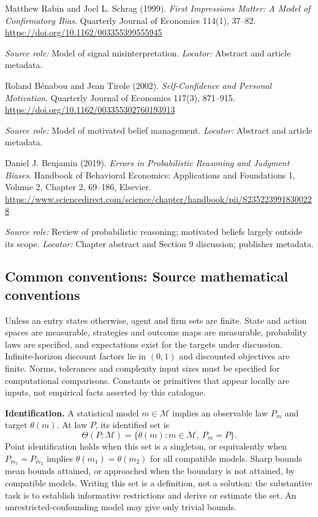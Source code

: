 \documentclass[11pt,a4paper]{article}
\begin{document}
\begin{enumerate}[label={[S\arabic*]},leftmargin=*]

\item Matthew Rabin and Joel L. Schrag (1999). \emph{First Impressions Matter: A Model of Confirmatory Bias}. Quarterly Journal of Economics 114(1), 37--82. \url{https://doi.org/10.1162/003355399555945}\par \textit{Source role:} Model of signal misinterpretation. \textit{Locator:} Abstract and article metadata.

\item Roland Bénabou and Jean Tirole (2002). \emph{Self-Confidence and Personal Motivation}. Quarterly Journal of Economics 117(3), 871--915. \url{https://doi.org/10.1162/003355302760193913}\par \textit{Source role:} Model of motivated belief management. \textit{Locator:} Abstract and article metadata.

\item Daniel J. Benjamin (2019). \emph{Errors in Probabilistic Reasoning and Judgment Biases}. Handbook of Behavioral Economics: Applications and Foundations 1, Volume 2, Chapter 2, 69--186, Elsevier. \url{https://www.sciencedirect.com/science/chapter/handbook/pii/S2352239918300228}\par \textit{Source role:} Review of probabilistic reasoning; motivated beliefs largely outside its scope. \textit{Locator:} Chapter abstract and Section 9 discussion; publisher metadata.

\end{enumerate}

\subsection*{Common conventions: Source mathematical conventions}

Unless an entry states otherwise, agent and firm sets are finite. State and action spaces are measurable, strategies and outcome maps are measurable, probability laws are specified, and expectations exist for the targets under discussion. Infinite-horizon discount factors lie in $(0,1)$ and discounted objectives are finite. Norms, tolerances and complexity input sizes must be specified for computational comparisons. Constants or primitives that appear locally are inputs, not empirical facts asserted by this catalogue.

\textbf{Identification.} A statistical model $m\in\mathcal M$ implies an observable law $P_m$ and target $\theta(m)$. At law $P$, its identified set is
\[
\Theta(P;\mathcal M)=\{\theta(m):m\in\mathcal M,\ P_m=P\}.
\]
Point identification holds when this set is a singleton, or equivalently when $P_{m_1}=P_{m_2}$ implies $\theta(m_1)=\theta(m_2)$ for all compatible models. Sharp bounds mean bounds attained, or approached when the boundary is not attained, by compatible models. Writing this set is a definition, not a solution: the substantive task is to establish informative restrictions and derive or estimate the set. An unrestricted-confounding model may give only trivial bounds.
\end{document}
